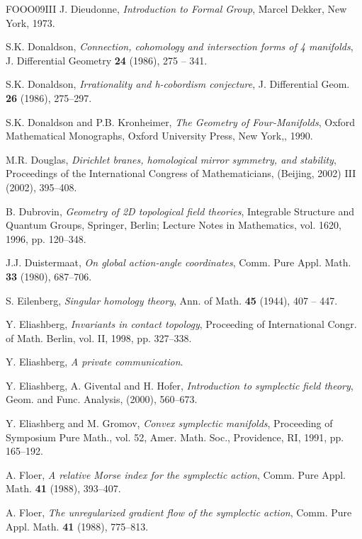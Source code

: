 \begin{thebibliography}{FOOO09III}
 J. Dieudonne, \emph{Introduction to Formal Group}, Marcel Dekker, New York, 1973.

 S.K. Donaldson, \emph{Connection, cohomology and intersection forms of 4 manifolds}, J. Differential Geometry \textbf{24} (1986), 275 – 341.

 S.K. Donaldson, \emph{Irrationality and h-cobordism conjecture}, J. Differential Geom. \textbf{26} (1986), 275–297.

 S.K. Donaldson and P.B. Kronheimer, \emph{The Geometry of Four-Manifolds}, Oxford Mathematical Monographs, Oxford University Press, New York,, 1990.

 M.R. Douglas, \emph{Dirichlet branes, homological mirror symmetry, and stability}, Proceedings of the International Congress of Mathematicians, (Beijing, 2002) III (2002), 395–408.

 B. Dubrovin, \emph{Geometry of 2D topological field theories}, Integrable Structure and Quantum Groups, Springer, Berlin; Lecture Notes in Mathematics, vol. 1620, 1996, pp. 120–348.

 J.J. Duistermaat, \emph{On global action-angle coordinates}, Comm. Pure Appl. Math. \textbf{33} (1980), 687–706.

 S. Eilenberg, \emph{Singular homology theory}, Ann. of Math. \textbf{45} (1944), 407 – 447.

 Y. Eliashberg, \emph{Invariants in contact topology}, Proceeding of International Congr. of Math. Berlin, vol. II, 1998, pp. 327–338.

 Y. Eliashberg, \emph{A private communication}.

 Y. Eliashberg, A. Givental and H. Hofer, \emph{Introduction to symplectic field theory}, Geom. and Func. Analysis, (2000), 560–673.

 Y. Eliashberg and M. Gromov, \emph{Convex symplectic manifolds}, Proceeding of Symposium Pure Math., vol. 52, Amer. Math. Soc., Providence, RI, 1991, pp. 165–192.

 A. Floer, \emph{A relative Morse index for the symplectic action}, Comm. Pure Appl. Math. \textbf{41} (1988), 393–407.

 A. Floer, \emph{The unregularized gradient flow of the symplectic action}, Comm. Pure Appl. Math. \textbf{41} (1988), 775–813.


\end{thebibliography}
